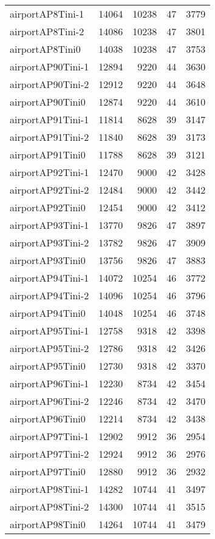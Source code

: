 \begin{tabular}{lrrrr}
airportAP8Tini-1 & 14064 & 10238 & 47 & 3779 \\
airportAP8Tini-2 & 14086 & 10238 & 47 & 3801 \\
airportAP8Tini0 & 14038 & 10238 & 47 & 3753 \\
airportAP90Tini-1 & 12894 & 9220 & 44 & 3630 \\
airportAP90Tini-2 & 12912 & 9220 & 44 & 3648 \\
airportAP90Tini0 & 12874 & 9220 & 44 & 3610 \\
airportAP91Tini-1 & 11814 & 8628 & 39 & 3147 \\
airportAP91Tini-2 & 11840 & 8628 & 39 & 3173 \\
airportAP91Tini0 & 11788 & 8628 & 39 & 3121 \\
airportAP92Tini-1 & 12470 & 9000 & 42 & 3428 \\
airportAP92Tini-2 & 12484 & 9000 & 42 & 3442 \\
airportAP92Tini0 & 12454 & 9000 & 42 & 3412 \\
airportAP93Tini-1 & 13770 & 9826 & 47 & 3897 \\
airportAP93Tini-2 & 13782 & 9826 & 47 & 3909 \\
airportAP93Tini0 & 13756 & 9826 & 47 & 3883 \\
airportAP94Tini-1 & 14072 & 10254 & 46 & 3772 \\
airportAP94Tini-2 & 14096 & 10254 & 46 & 3796 \\
airportAP94Tini0 & 14048 & 10254 & 46 & 3748 \\
airportAP95Tini-1 & 12758 & 9318 & 42 & 3398 \\
airportAP95Tini-2 & 12786 & 9318 & 42 & 3426 \\
airportAP95Tini0 & 12730 & 9318 & 42 & 3370 \\
airportAP96Tini-1 & 12230 & 8734 & 42 & 3454 \\
airportAP96Tini-2 & 12246 & 8734 & 42 & 3470 \\
airportAP96Tini0 & 12214 & 8734 & 42 & 3438 \\
airportAP97Tini-1 & 12902 & 9912 & 36 & 2954 \\
airportAP97Tini-2 & 12924 & 9912 & 36 & 2976 \\
airportAP97Tini0 & 12880 & 9912 & 36 & 2932 \\
airportAP98Tini-1 & 14282 & 10744 & 41 & 3497 \\
airportAP98Tini-2 & 14300 & 10744 & 41 & 3515 \\
airportAP98Tini0 & 14264 & 10744 & 41 & 3479 \\

\end{tabular}
